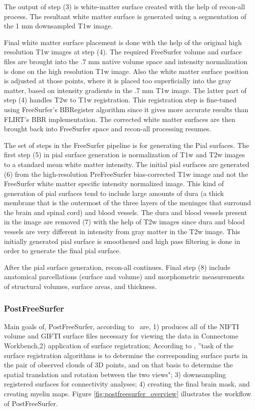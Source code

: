 The output of step (3) is white-matter surface created with the help of recon-all process. The resultant white matter surface is generated using a segmentation of the 1 mm downsampled T1w image.

Final white matter surface placement is done with the help of the original high resolution T1w images at step (4). The required FreeSurfer volume and surface files are brought into the .7 mm native volume space and intensity normalization is done on the high resolution T1w image. Also the white matter surface position is adjusted at those points, where it is placed too superficially into the gray matter, based on intensity gradients in the .7 mm T1w image. The latter part of step (4) handles T2w to T1w registration. This registration step is fine-tuned using FreeSurfer's BBRegister algorithm since it gives more accurate results than FLIRT's BBR implementation. The corrected white matter surfaces are then brought back into FreeSurfer space and recon-all processing resumes.

The set of steps in the FreeSurfer pipeline is for generating the Pial surfaces. The first step (5) in pial surface generation is normalization of T1w and T2w images to a standard mean white matter intensity. The initial pial surfaces are generated (6) from the high-resolution PreFreeSurfer bias-corrected T1w image and not the FreeSurfer white matter specific intensity normalized image. This kind of generation of pial surfaces tend to include large amounts of dura (a thick membrane that is the outermost of the three layers of the meninges that surround the brain and spinal cord) and blood vessels. The dura and blood vessels present in the image are removed (7) with the help of T2w images since dura and blood vessels are very different in intensity from gray matter in the T2w image. This initially generated pial surface is smoothened and high pass filtering is done in order to generate the final pial surface.

After the pial surface generation, recon-all continues. Final step (8) include anatomical parcellations (surface and volume) and morphometric measurements of structural volumes, surface areas, and thickness.

\subsubsection{PostFreeSurfer}
Main goals of, PostFreeSurfer, according to~\cite{Gla13} are, 1) produces all of the NIFTI volume and GIFTI surface files necessary for viewing the data in Connectome Workbench,2) application of surface registration; According to \cite{DBLP:journals/corr/HrgeticP13}, ''task of the surface registration algorithms is to determine the corresponding surface parts in the pair of observed clouds of 3D points, and on that basis to determine the spatial translation and rotation between the two views"; 3) downsampling registered surfaces for connectivity analyses; 4) creating the final brain mask, and creating myelin maps. Figure \ref{fig:postfreesurfer_overview} illustrates the workflow of PostFreeSurfer.\\


